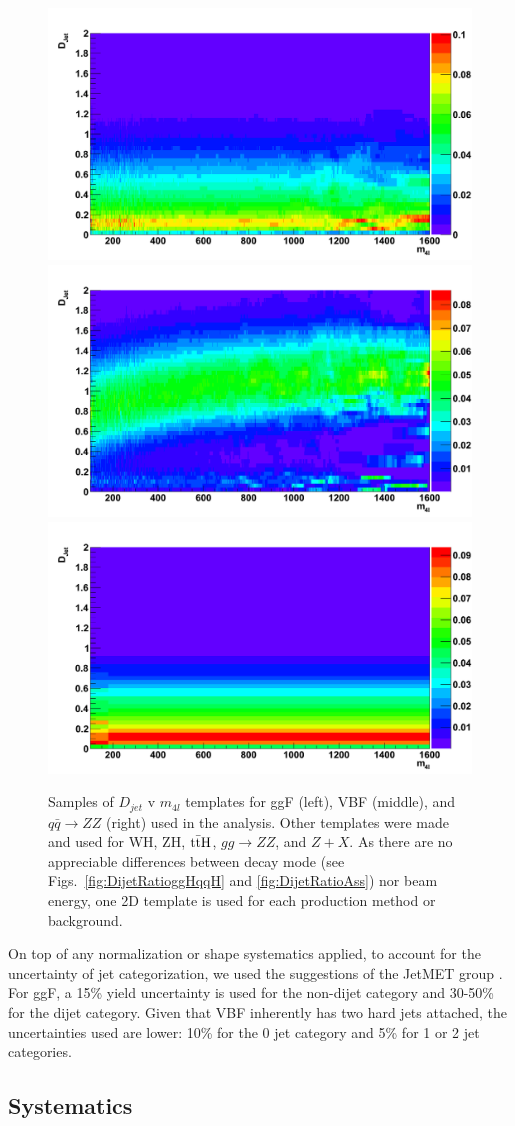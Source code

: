 \begin{figure}[htbp]
\begin{center}
\includegraphics[width=.3\linewidth]{HiggsDiscovery/figures/ggH_Fisher_2D.png}
\includegraphics[width=.3\linewidth]{HiggsDiscovery/figures/qqH_Fisher_2D.png}
\includegraphics[width=.3\linewidth]{HiggsDiscovery/figures/qqZZ_Fisher_2D.png} \\
\caption[Templates of $D_jet$ for Signals and Background]{Samples of $D_{jet}$ v $m_{4l}$ templates for ggF (left), VBF (middle), and $q\bar{q}\rightarrow ZZ$ (right) used in the analysis. Other templates were made and used for WH, ZH, $\rm{t\bar{t}H}$, $gg\rightarrow ZZ$, and $Z+X$. As there are no appreciable differences between decay mode (see Figs.~\ref{fig:DijetRatioggHqqH} and \ref{fig:DijetRatioAss}) nor beam energy, one 2D template is used for each production method or background.}
\label{fig:FisherTemplates}
\end{center}
\end{figure}

On top of any normalization or shape systematics applied, to account for the uncertainty of jet categorization, we used the suggestions of the JetMET group \cite{Chatrchyan:2014nva}. For ggF, a 15\% yield uncertainty is used for the non-dijet category and 30-50\% for the dijet category. Given that VBF inherently has two hard jets attached, the uncertainties used are lower: 10\% for the 0 jet category and 5\% for 1 or 2 jet categories.

\subsection{Systematics}
\label{sec:ZZ4lSystematics}

